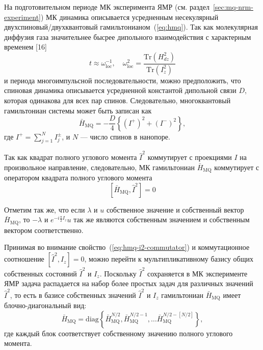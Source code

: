 На подготовительном периоде МК эксперимента ЯМР (см. раздел~\ref{sec:mq-nrm-experiment})
МК динамика описывается усредненным несекулярный двухспиновый/двухквантовый гамильтонианом~(\ref{eq:hmq}).
Так как молекулярная диффузия газа значительнее бысрее дипольного взаимодействия с характерным временем [16]
%
\begin{equation}
  t \approx \omega^{-1}_\mathrm{loc},
  \quad
  \omega^2_\mathrm{loc} = \frac{\mathrm{Tr}(H^2_{dz})}{\mathrm{Tr}(I^2_z)}
\end{equation}
%
и периода многоимпульсной последовательности,
можно предположить,
что спиновая динамика описывается усредненной константой дипольной связи $D$,
которая одинакова для всех пар спинов.
Следовательно, многоквантовый гамильтониан системы может быть записан как
\begin{equation}\label{eq:mq-hamiltoninan-equivalent-spins}
  \bar H_\mathrm{MQ} = - \dfrac{D}{4} \left\{
      \left( I^{+} \right)^2 + \left( I^{-} \right)^2
  \right\},
\end{equation}
где $I^{+} = \sum\limits_{j=1}^{N} I^{\pm}_j$,
и $N$ --- число спинов в нанопоре.

Так как квадрат полного углового момента $\hat I^2$ коммутирует с
проекциями $I$ на произвольное направление,
следовательно, МК гамильтониан $\bar H_\mathrm{MQ}$ коммутирует с оператором квадрата полного углового момента
\begin{equation}\label{eq:hmq-i2-commutator}
  \left[ \bar H_\mathrm{MQ}, \hat I^2 \right] = 0
\end{equation}

Отметим так же,
что если $\lambda$ и $u$ собственное значение и собственный вектор  $\bar H_\mathrm{MQ}$,
то $-\lambda$ и $e^{-i\frac{\pi}{2}I_z}u$
так же являются собственным значением и собственным вектором соответственно.

Принимая во внимание свойство~(\ref{eq:hmq-i2-commutator}) и коммутационное соотношение ${[\hat I^2, I_z] = 0}$,
можно перейти к мультипликативному базису общих собственных состояний $\hat I^2$ и $I_z$.
Поскольку $\hat I^2$ сохраняется в МК эксперименте ЯМР
задача распадается на набор более простых задач для различных значений $\hat I^2$,
то есть в базисе собственных значений  $\hat I^2$ и $I_z$
гамильтониан $\bar H_\mathrm{MQ}$ имеет блочно-диагональный вид:
\begin{equation}
  \bar H_\mathrm{MQ} = \mathrm{diag} \left\{
    \bar H_\mathrm{MQ}^{N/2},
    \bar H_\mathrm{MQ}^{N/2 - 1},
    \dots
    \bar H_\mathrm{MQ}^{N/2 - [N/2]}
  \right\},
\end{equation}
где каждый блок соответствует собственному значению полного углового момента.

